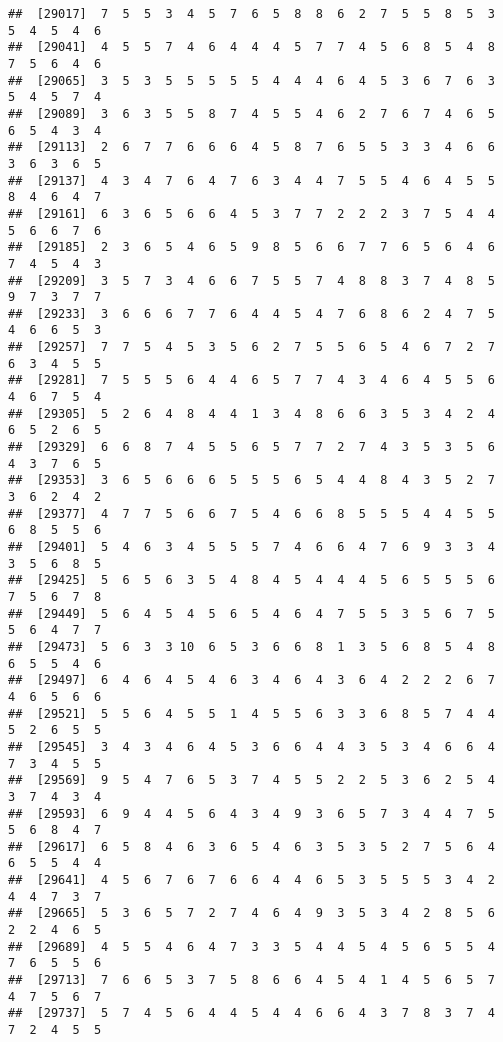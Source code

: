 \documentclass[
]{book}
\begin{document}
\begin{verbatim}
##  [29017]  7  5  5  3  4  5  7  6  5  8  8  6  2  7  5  5  8  5  3  5  4  5  4  6
##  [29041]  4  5  5  7  4  6  4  4  4  5  7  7  4  5  6  8  5  4  8  7  5  6  4  6
##  [29065]  3  5  3  5  5  5  5  5  4  4  4  6  4  5  3  6  7  6  3  5  4  5  7  4
##  [29089]  3  6  3  5  5  8  7  4  5  5  4  6  2  7  6  7  4  6  5  6  5  4  3  4
##  [29113]  2  6  7  7  6  6  6  4  5  8  7  6  5  5  3  3  4  6  6  3  6  3  6  5
##  [29137]  4  3  4  7  6  4  7  6  3  4  4  7  5  5  4  6  4  5  5  8  4  6  4  7
##  [29161]  6  3  6  5  6  6  4  5  3  7  7  2  2  2  3  7  5  4  4  5  6  6  7  6
##  [29185]  2  3  6  5  4  6  5  9  8  5  6  6  7  7  6  5  6  4  6  7  4  5  4  3
##  [29209]  3  5  7  3  4  6  6  7  5  5  7  4  8  8  3  7  4  8  5  9  7  3  7  7
##  [29233]  3  6  6  6  7  7  6  4  4  5  4  7  6  8  6  2  4  7  5  4  6  6  5  3
##  [29257]  7  7  5  4  5  3  5  6  2  7  5  5  6  5  4  6  7  2  7  6  3  4  5  5
##  [29281]  7  5  5  5  6  4  4  6  5  7  7  4  3  4  6  4  5  5  6  4  6  7  5  4
##  [29305]  5  2  6  4  8  4  4  1  3  4  8  6  6  3  5  3  4  2  4  6  5  2  6  5
##  [29329]  6  6  8  7  4  5  5  6  5  7  7  2  7  4  3  5  3  5  6  4  3  7  6  5
##  [29353]  3  6  5  6  6  6  5  5  5  6  5  4  4  8  4  3  5  2  7  3  6  2  4  2
##  [29377]  4  7  7  5  6  6  7  5  4  6  6  8  5  5  5  4  4  5  5  6  8  5  5  6
##  [29401]  5  4  6  3  4  5  5  5  7  4  6  6  4  7  6  9  3  3  4  3  5  6  8  5
##  [29425]  5  6  5  6  3  5  4  8  4  5  4  4  4  5  6  5  5  5  6  7  5  6  7  8
##  [29449]  5  6  4  5  4  5  6  5  4  6  4  7  5  5  3  5  6  7  5  5  6  4  7  7
##  [29473]  5  6  3  3 10  6  5  3  6  6  8  1  3  5  6  8  5  4  8  6  5  5  4  6
##  [29497]  6  4  6  4  5  4  6  3  4  6  4  3  6  4  2  2  2  6  7  4  6  5  6  6
##  [29521]  5  5  6  4  5  5  1  4  5  5  6  3  3  6  8  5  7  4  4  5  2  6  5  5
##  [29545]  3  4  3  4  6  4  5  3  6  6  4  4  3  5  3  4  6  6  4  7  3  4  5  5
##  [29569]  9  5  4  7  6  5  3  7  4  5  5  2  2  5  3  6  2  5  4  3  7  4  3  4
##  [29593]  6  9  4  4  5  6  4  3  4  9  3  6  5  7  3  4  4  7  5  5  6  8  4  7
##  [29617]  6  5  8  4  6  3  6  5  4  6  3  5  3  5  2  7  5  6  4  6  5  5  4  4
##  [29641]  4  5  6  7  6  7  6  6  4  4  6  5  3  5  5  5  3  4  2  4  4  7  3  7
##  [29665]  5  3  6  5  7  2  7  4  6  4  9  3  5  3  4  2  8  5  6  2  2  4  6  5
##  [29689]  4  5  5  4  6  4  7  3  3  5  4  4  5  4  5  6  5  5  4  7  6  5  5  6
##  [29713]  7  6  6  5  3  7  5  8  6  6  4  5  4  1  4  5  6  5  7  4  7  5  6  7
##  [29737]  5  7  4  5  6  4  4  5  4  4  6  6  4  3  7  8  3  7  4  7  2  4  5  5

\end{verbatim}
\end{document}
